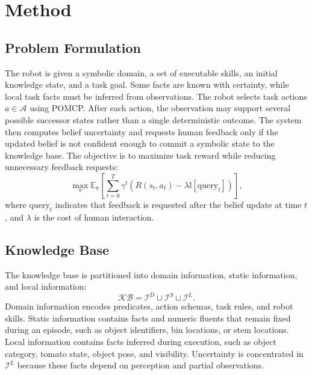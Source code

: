 \section{Method}
\label{sec:method}

\subsection{Problem Formulation}

The robot is given a symbolic domain, a set of executable skills, an initial knowledge state, and a task goal. Some facts are known with certainty, while local task facts must be inferred from observations. The robot selects task actions $a \in \mathcal{A}$ using POMCP. After each action, the observation may support several possible successor states rather than a single deterministic outcome. The system then computes belief uncertainty and requests human feedback only if the updated belief is not confident enough to commit a symbolic state to the knowledge base. The objective is to maximize task reward while reducing unnecessary feedback requests:
\begin{equation}
\max_{\pi} \mathbb{E}_{\pi}\left[\sum_{t=0}^{T}\gamma^t
\left(R(s_t,a_t)-\lambda \mathbb{I}[\mathrm{query}_t]\right)\right],
\label{eq:objective}
\end{equation}
where $\mathrm{query}_t$ indicates that feedback is requested after the belief update at time $t$, and $\lambda$ is the cost of human interaction.

\subsection{Knowledge Base}

The knowledge base is partitioned into domain information, static information, and local information:
\begin{equation}
\mathcal{KB}=\mathcal{I}^{D}\sqcup \mathcal{I}^{S}\sqcup \mathcal{I}^{L}.
\end{equation}
Domain information encodes predicates, action schemas, task rules, and robot skills. Static information contains facts and numeric fluents that remain fixed during an episode, such as object identifiers, bin locations, or stem locations. Local information contains facts inferred during execution, such as object category, tomato state, object pose, and visibility. Uncertainty is concentrated in $\mathcal{I}^{L}$ because these facts depend on perception and partial observations.

